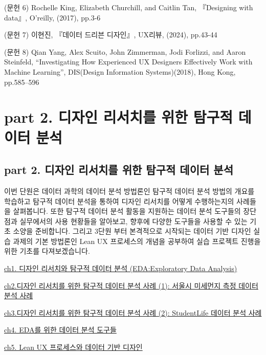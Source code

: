 \documentclass[
  letterpaper,
]{book}
\begin{document}
(문헌 6) Rochelle King, Elizabeth Churchill, and Caitlin Tan,
『Designing with data』, O'reilly, (2017), pp.3-6

(문헌 7) 이현진, 『데이터 드리븐 디자인』, UX리뷰, (2024), pp.43-44

(문헌 8) Qian Yang, Alex Scuito, John Zimmerman, Jodi Forlizzi, and
Aaron Steinfeld, ``Investigating How Experienced UX Designers
Effectively Work with Machine Learning'', DIS(Design Information
Systems)(2018), Hong Kong, pp.585--596

\part{\textbf{part 2. 디자인 리서치를 위한 탐구적 데이터 분석}}

\chapter{part 2. 디자인 리서치를 위한 탐구적 데이터
분석}\label{part-2.-uxb514uxc790uxc778-uxb9acuxc11cuxce58uxb97c-uxc704uxd55c-uxd0d0uxad6cuxc801-uxb370uxc774uxd130-uxbd84uxc11d-1}

이번 단원은 데이터 과학의 데이터 분석 방법론인 탐구적 데이터 분석 방법의
개요를 학습하고 탐구적 데이터 분석을 통하여 디자인 리서치를 어떻게
수행하는지의 사례들을 살펴봅니다. 또한 탐구적 데이터 분석 활동을
지원하는 데이터 분석 도구들의 장단점과 실무에서의 사용 현황들을
알아보고, 향후에 다양한 도구들을 사용할 수 있는 기초 소양을 준비합니다.
그리고 3단원 부터 본격적으로 시작되는 데이터 기반 디자인 실습 과제의
기본 방법론인 Lean UX 프로세스의 개념을 공부하여 실습 프로젝트 진행을
위한 기초를 다져보겠습니다.

\href{ch1.\%20디자인\%20리서치와\%20탐구적\%20데이터\%20분석.qmd}{ch1.
디자인 리서치와 탐구적 데이터 분석 (EDA:Exploratory Data Analysis)}

\href{ch2.디자인\%20리서치를\%20위한\%20탐구적\%20데이터\%20분석\%20사례\%20(1).qmd}{ch2.디자인
리서치를 위한 탐구적 데이터 분석 사례 (1): 서울시 미세먼지 측정 데이터
분석 사례}

\href{ch3.디자인\%20리서치를\%20위한\%20탐구적\%20데이터\%20분석\%20사례\%20(2).qmd}{ch3.디자인
리서치를 위한 탐구적 데이터 분석 사례 (2): StudentLife 데이터 분석 사례}

\href{ch4.\%20EDA를\%20위한\%20데이터\%20분석\%20도구들.qmd}{ch4. EDA를
위한 데이터 분석 도구들}

\href{ch5.\%20Lean\%20UX\%20프로세스와\%20데이터\%20기반\%20디자인.qmd}{ch5.
Lean UX 프로세스와 데이터 기반 디자인}
\end{document}
